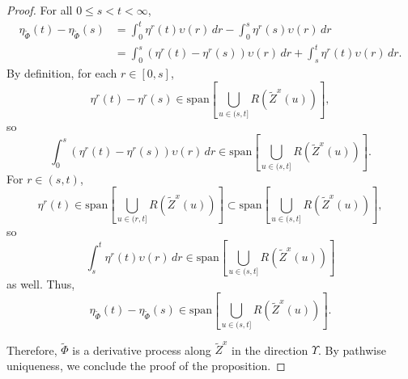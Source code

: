 \documentclass[11pt]{article}
\theoremstyle{definition}
\theoremstyle{plain}
\begin{document}
\begin{appendices}
\begin{proof}
For all \( 0 \le s < t < \infty \),
\begin{align*}
\eta_{\tilde{\Phi}}(t) - \eta_{\tilde{\Phi}}(s)
&= \int_0^t \eta^r(t) \upsilon(r)\,dr - \int_0^s \eta^r(s) \upsilon(r)\,dr \\
&= \int_0^s (\eta^r(t) - \eta^r(s)) \upsilon(r)\,dr + \int_s^t \eta^r(t) \upsilon(r)\,dr.
\end{align*}
By definition, for each \( r \in [0,s] \), 
\[
\eta^r(t) - \eta^r(s) \in \text{span} \left[ \bigcup_{u \in (s,t]} R(\tilde{Z}^x(u)) \right],
\]
so
\[
\int_0^s (\eta^r(t) - \eta^r(s)) \upsilon(r)\,dr \in \text{span} \left[ \bigcup_{u \in (s,t]} R(\tilde{Z}^x(u)) \right].
\]
For \( r \in (s,t) \),
\[
\eta^r(t) \in \text{span} \left[ \bigcup_{u \in (r,t]} R(\tilde{Z}^x(u)) \right] \subset \text{span} \left[ \bigcup_{u \in (s,t]} R(\tilde{Z}^x(u)) \right],
\]
so
\[
\int_s^t \eta^r(t) \upsilon(r)\,dr \in \text{span} \left[ \bigcup_{u \in (s,t]} R(\tilde{Z}^x(u)) \right]
\]
as well. Thus,
\[
\eta_{\tilde{\Phi}}(t) - \eta_{\tilde{\Phi}}(s) \in \text{span} \left[ \bigcup_{u \in (s,t]} R(\tilde{Z}^x(u)) \right].
\]

Therefore, \( \tilde{\Phi} \) is a derivative process along \( \tilde{Z}^x \) in the direction \( \Upsilon \). 
By pathwise uniqueness, we conclude the proof of the proposition. 
\end{proof}


\end{appendices}
\end{document}
